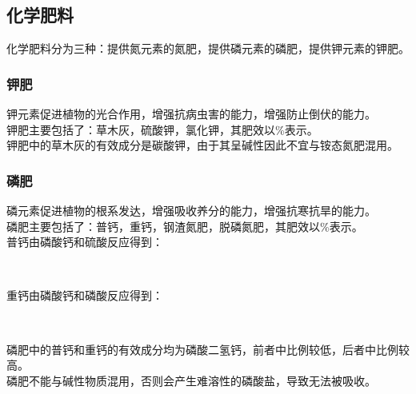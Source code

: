 \documentclass[UTF8]{ctexart}
\begin{document}
\newpage

\subsection{化学肥料}
    化学肥料分为三种：提供氮元素的氮肥，提供磷元素的磷肥，提供钾元素的钾肥。

\subsubsection{钾肥}
    钾元素促进植物的光合作用，增强抗病虫害的能力，增强防止倒伏的能力。\\[3mm]
    钾肥主要包括了：草木灰，硫酸钾，氯化钾，其肥效以\%表示。\\[3mm]
    钾肥中的草木灰的有效成分是碳酸钾，由于其呈碱性因此不宜与铵态氮肥混用。

\subsubsection{磷肥}
    磷元素促进植物的根系发达，增强吸收养分的能力，增强抗寒抗旱的能力。\\[3mm]
    磷肥主要包括了：普钙，重钙，钢渣氮肥，脱磷氮肥，其肥效以\%表示。\\[3mm]
    普钙由磷酸钙和硫酸反应得到：
    \begin{center}
        \\[4mm]
    \end{center}
    重钙由磷酸钙和磷酸反应得到：
    \begin{center}
        \\[4mm]
    \end{center}
    磷肥中的普钙和重钙的有效成分均为磷酸二氢钙，前者中比例较低，后者中比例较高。\\[3mm]
    磷肥不能与碱性物质混用，否则会产生难溶性的磷酸盐，导致无法被吸收。
\end{document}
